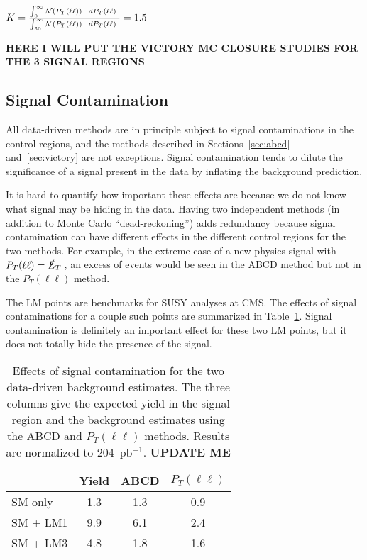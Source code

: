 \newcommand{\ptll} {\ensuremath{P_T(\ell\ell)}}
\begin{center}
$ K = \frac{\int_0^{\infty} {\cal N}(\ptll)~~d\ptll~}{\int_{50}^{\infty} {\cal N}(\ptll)~~d\ptll~} = 1.5$
\end{center}

{\color{red} \bf HERE I WILL PUT THE VICTORY MC CLOSURE STUDIES FOR THE 3 SIGNAL REGIONS}

\subsection{Signal Contamination}
\label{sec:sigcont}

All data-driven methods are in principle subject to signal contaminations
in the control regions, and the methods described in 
Sections~\ref{sec:abcd} and~\ref{sec:victory} are not exceptions.
Signal contamination tends to dilute the significance of a signal
present in the data by inflating the background prediction.

It is hard to quantify how important these effects are because we 
do not know what signal may be hiding in the data.  Having two
independent methods (in addition to Monte Carlo ``dead-reckoning'')
adds redundancy because signal contamination can have different effects
in the different control regions for the two methods.
For example, in the extreme case of a
new physics signal 
with $P_T(\ell \ell) = \met$, an excess of events would be seen 
in the ABCD method but not in the $P_T(\ell \ell)$ method.


The LM points are benchmarks for SUSY analyses at CMS.  The effects
of signal contaminations for a couple such points are summarized
in Table~\ref{tab:sigcont}. Signal contamination is definitely an important
effect for these two LM points, but it does not totally hide the
presence of the signal.


\begin{table}[htb]
\begin{center}
\caption{\label{tab:sigcont} Effects of signal contamination 
for the two data-driven background estimates. The three columns give
the expected yield in the signal region and the background estimates
using the ABCD and $P_T(\ell \ell)$ methods. Results are normalized to 204~pb$^{-1}$.
{\color{red} \bf UPDATE ME }
}
\begin{tabular}{lccc}
\hline
            &      Yield      &      ABCD    & $P_T(\ell \ell)$  \\
\hline
SM only     &       1.3      &      1.3    &       0.9        \\
SM + LM1    &       9.9      &      6.1    &       2.4        \\
SM + LM3    &       4.8      &      1.8    &       1.6        \\
\hline
\end{tabular}
\end{center}
\end{table}

